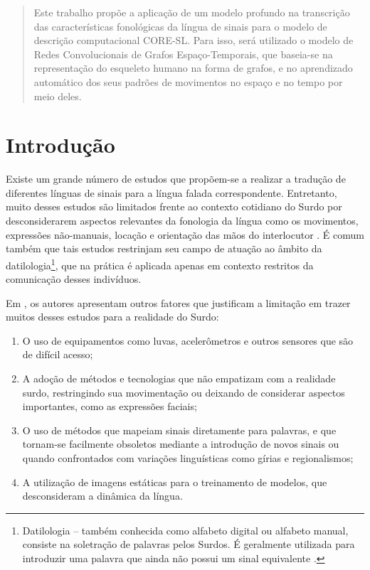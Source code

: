 

\maketitle
\begin{abstract}
Este trabalho propõe a aplicação de um modelo profundo na transcrição das características fonológicas da língua de sinais para o modelo de descrição computacional CORE-SL. Para isso, será utilizado o modelo de Redes Convolucionais de Grafos Espaço-Temporais, que baseia-se na representação do esqueleto humano na forma de grafos, e no aprendizado automático dos seus padrões de movimentos no espaço e no tempo por meio deles.
\end{abstract}



\section{Introdução} %
\label{sec:introducao}
Existe um grande número de estudos que propõem-se a realizar a tradução de diferentes línguas de sinais para a língua falada correspondente. Entretanto, muito desses estudos são limitados frente ao contexto cotidiano do Surdo por desconsiderarem aspectos relevantes da fonologia da língua como os movimentos, expressões não-manuais, locação e orientação das mãos do interlocutor \cite{quadros-2004}. É comum também que tais estudos restrinjam seu campo de atuação ao âmbito da datilologia\footnote{
    Datilologia – também conhecida como alfabeto digital ou alfabeto manual, consiste na soletração de palavras pelos Surdos. É geralmente utilizada para introduzir uma palavra que ainda não possui um sinal equivalente \cite{quadros-2004}\cite{pereira-choi-2011}.
}, que na prática é aplicada apenas em contexto restritos da comunicação desses indivíduos.

Em \cite{antunes-hcisl-2011}, os autores apresentam outros fatores que justificam a limitação em trazer muitos desses estudos para a realidade do Surdo: 
\begin{enumerate}
    \item O uso de equipamentos como luvas, acelerômetros e outros sensores que são de difícil acesso; 
    \item A adoção de métodos e tecnologias que não empatizam com a realidade surdo, restringindo sua movimentação ou deixando de considerar aspectos importantes, como as expressões faciais;
    \item O uso de métodos que mapeiam sinais diretamente para palavras, e que tornam-se facilmente obsoletos mediante a introdução de novos sinais ou quando confrontados com variações linguísticas como gírias e regionalismos; 
    \item A utilização de imagens estáticas para o treinamento de modelos, que desconsideram a dinâmica da língua.
\end{enumerate}

